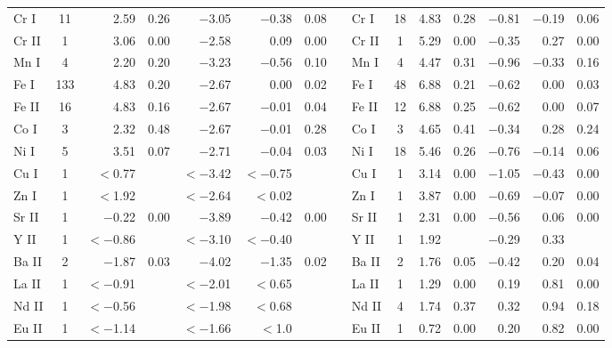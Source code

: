 \documentclass{emulateapj}
\begin{document}
\begin{longtable*}{lcrcrrcclcrcrrc}
  Cr \textsc{I} &  11 &    2.59 &    0.26 & $-$3.05 & $-$0.38 &    0.08 &&
  Cr \textsc{I} &  18 &    4.83 &    0.28 & $-$0.81 & $-$0.19 &    0.06 \\
 Cr \textsc{II} &   1 &    3.06 &    0.00 & $-$2.58 &    0.09 &    0.00 &&
 Cr \textsc{II} &   1 &    5.29 &    0.00 & $-$0.35 &    0.27 &    0.00 \\
  Mn \textsc{I} &   4 &    2.20 &    0.20 & $-$3.23 & $-$0.56 &    0.10 &&
  Mn \textsc{I} &   4 &    4.47 &    0.31 & $-$0.96 & $-$0.33 &    0.16 \\
  Fe \textsc{I} & 133 &    4.83 &    0.20 & $-$2.67 &    0.00 &    0.02 &&
  Fe \textsc{I} &  48 &    6.88 &    0.21 & $-$0.62 &    0.00 &    0.03 \\
 Fe \textsc{II} &  16 &    4.83 &    0.16 & $-$2.67 & $-$0.01 &    0.04 &&
 Fe \textsc{II} &  12 &    6.88 &    0.25 & $-$0.62 &    0.00 &    0.07 \\
  Co \textsc{I} &   3 &    2.32 &    0.48 & $-$2.67 & $-$0.01 &    0.28 &&
  Co \textsc{I} &   3 &    4.65 &    0.41 & $-$0.34 &    0.28 &    0.24 \\
  Ni \textsc{I} &   5 &    3.51 &    0.07 & $-$2.71 & $-$0.04 &    0.03 &&
  Ni \textsc{I} &  18 &    5.46 &    0.26 & $-$0.76 & $-$0.14 &    0.06 \\
  Cu \textsc{I} &   1 & $<$0.77 &         &$<-$3.42 &$<-$0.75 &         &&
  Cu \textsc{I} &   1 &    3.14 &    0.00 & $-$1.05 & $-$0.43 &    0.00 \\
  Zn \textsc{I} &   1 & $<$1.92 &         &$<-$2.64 & $<$0.02 &         &&
  Zn \textsc{I} &   1 &    3.87 &    0.00 & $-$0.69 & $-$0.07 &    0.00 \\
 Sr \textsc{II} &   1 & $-$0.22 &    0.00 & $-$3.89 & $-$0.42 &    0.00 &&
 Sr \textsc{II} &   1 &    2.31 &    0.00 & $-$0.56 &    0.06 &    0.00 \\
  Y \textsc{II} &   1 &$<-$0.86 &         &$<-$3.10 &$<-$0.40 &         &&
  Y \textsc{II} &   1 &    1.92 &         & $-$0.29 &    0.33 &         \\
 Ba \textsc{II} &   2 & $-$1.87 &    0.03 & $-$4.02 & $-$1.35 &    0.02 &&
 Ba \textsc{II} &   2 &    1.76 &    0.05 & $-$0.42 &    0.20 &    0.04 \\
 La \textsc{II} &   1 &$<-$0.91 &         &$<-$2.01 & $<$0.65 &         &&
 La \textsc{II} &   1 &    1.29 &    0.00 &    0.19 &    0.81 &    0.00 \\
 Nd \textsc{II} &   1 &$<-$0.56 &         &$<-$1.98 & $<$0.68 &         &&
 Nd \textsc{II} &   4 &    1.74 &    0.37 &    0.32 &    0.94 &    0.18 \\
 Eu \textsc{II} &   1 &$<-$1.14 &         &$<-$1.66 &  $<$1.0 &         &&
 Eu \textsc{II} &   1 &    0.72 &    0.00 &    0.20 &    0.82 &    0.00 \\
\end{longtable*}
\end{document}
